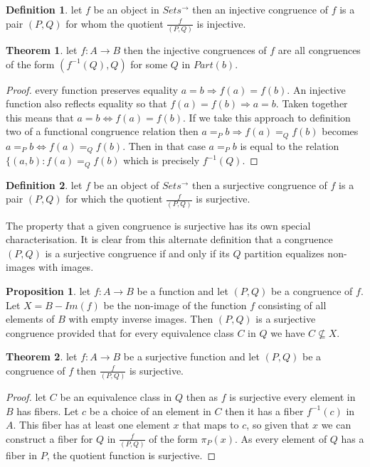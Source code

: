 \documentclass[a4paper,11pt, notitlepage]{report}
\theoremstyle{definition}
\newtheorem{definition}{Definition}[section]
\newtheorem{theorem}{Theorem}[section]
\newtheorem{proposition}{Proposition}[section]
\begin{document}
\begin{definition}
let $f$ be an object in $Sets^{\to}$ then an injective congruence of $f$ is a pair $(P,Q)$ for whom the quotient $\frac{f}{(P,Q)}$ is injective.
\end{definition}

\begin{theorem}
let $f: A \to B$ then the injective congruences of $f$ are all congruences of the form $(f^{-1}(Q),Q)$ for some $Q$ in $Part(b)$.
\end{theorem}

\begin{proof}
every function preserves equality $a = b \Rightarrow f(a) = f(b)$. An injective function also reflects equality so that $f(a) = f(b) \Rightarrow a = b$. Taken together this means that $a = b \Leftrightarrow f(a) = f(b)$. If we take this approach to definition two of a functional congruence relation then $a =_P b \Rightarrow f(a) =_Q f(b)$ becomes $a =_P b \Leftrightarrow f(a) =_Q f(b)$. Then in that case $a =_P b$ is equal to the relation $\{(a,b) : f(a) =_Q f(b)$ which is precisely $f^{-1}(Q)$.
\end{proof}

\begin{definition}
let $f$ be an object of $Sets^{\to}$ then a surjective congruence of $f$ is a pair $(P,Q)$ for which the quotient $\frac{f}{(P,Q)}$ is surjective.
\end{definition}

The property that a given congruence is surjective has its own special characterisation. It is clear from this alternate definition that a congruence $(P,Q)$ is a surjective congruence if and only if its $Q$ partition equalizes non-images with images.

\begin{proposition}
let $f: A \to B$ be a function and let $(P,Q)$ be a congruence of $f$. Let $X = B - Im(f)$ be the non-image of the function $f$ consisting of all elements of $B$ with empty inverse images. Then $(P,Q)$ is a surjective congruence provided that for every equivalence class $C$ in $Q$ we have $C \not\subseteq X$.
\end{proposition}

\begin{theorem}
let $f: A \to B$ be a surjective function and let $(P,Q)$ be a congruence of $f$ then $\frac{f}{(P,Q)}$ is surjective.
\end{theorem}

\begin{proof}
let $C$ be an equivalence class in $Q$ then as $f$ is surjective every element in $B$ has fibers. Let $c$ be a choice of an element in $C$ then it has a fiber $f^{-1}(c)$ in $A$. This fiber has at least one element $x$ that maps to $c$, so given that $x$ we can construct a fiber for $Q$ in $\frac{f}{(P,Q)}$ of the form $\pi_{P}(x)$. As every element of $Q$ has a fiber in $P$, the quotient function is surjective.
\end{proof}
\end{document}
